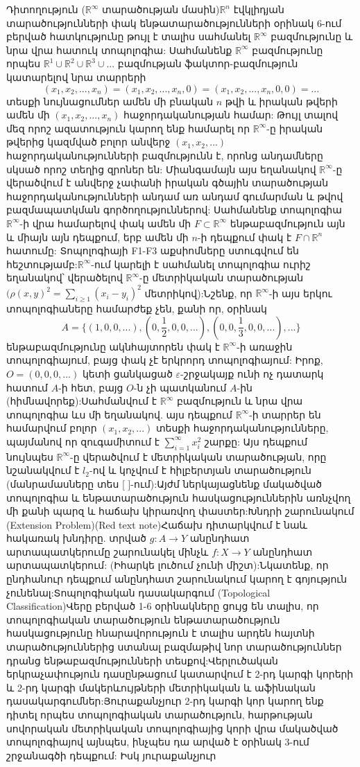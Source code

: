 Դիտողություն ($\mathbb{R}^\infty$ տարածության մասին)$\mathbb{R}^n$ էվկլիդյան տարածությունների փակ ենթատարածությունների օրինակ 6-ում բերված հատկությունը թույլ է տալիս սահմանել $\mathbb{R}^\infty$ բազմությունը և նրա վրա հատուկ տոպոլոգիա: Սահմանենք $\mathbb{R}^\infty$ բազմությունը որպես $\mathbb{R}^1 \cup \mathbb{R}^2 \cup \mathbb{R}^3 \cup ...$ բազմության ֆակտոր-բազմություն կատարելով նրա տարրերի$$(x_1, x_2, ..., x_n) = (x_1, x_2, ..., x_n, 0) = (x_1, x_2, ..., x_n, 0, 0) = ...$$տեսքի նույնացումներ ամեն մի բնական $n$ թվի և իրական թվերի ամեն մի $(x_1, x_2, ..., x_n)$ հաջորդականության համար: Թույլ տալով մեզ որոշ ազատություն կարող ենք համարել որ $\mathbb{R}^\infty$-ը իրական թվերից կազմված բոլոր անվերջ $(x_1, x_2, ...)$ հաջորդականությունների բազմությունն է, որոնց անդամները սկսած որոշ տեղից զրոներ են: Միանգամայն այս եղանակով $\mathbb{R}^\infty$-ը վերածվում է անվերջ չափանի իրական գծային տարածության հաջորդականությունների անդամ առ անդամ գումարման և թվով բազմապատկման գործողություններով: Սահմանենք տոպոլոգիա $\mathbb{R}^\infty$-ի վրա համարելով փակ ամեն մի $F \subset \mathbb{R}^\infty$ ենթաբազմություն այն և միայն այն դեպքում, երբ ամեն մի $n$-ի դեպքում փակ է $F \cap \mathbb{R}^n$ հատումը: Տոպոլոգիայի F1-F3 աքսիոմները ստուգվում են հեշտությամբ:$\mathbb{R}^\infty$-ում կարելի է սահմանել տոպոլոգիա ուրիշ եղանակով՝ վերածելով $\mathbb{R}^\infty$-ը մետրիկական տարածության $(\rho(x, y)^2 = \sum_{i \ge 1} (x_i - y_i)^2$ մետրիկով):Նշենք, որ $\mathbb{R}^\infty$-ի այս երկու տոպոլոգիաները համարժեք չեն, քանի որ, օրինակ$$A = \{(1, 0, 0, ...), (0, \frac{1}{2}, 0, 0, ...), (0, 0, \frac{1}{3}, 0, 0, ...), ...\}$$ենթաբազմությունը ակնհայտորեն փակ է $\mathbb{R}^\infty$-ի առաջին տոպոլոգիայում, բայց փակ չէ երկրորդ տոպոլոգիայում: Իրոք, $O=(0, 0, 0, ...)$ կետի ցանկացած $\varepsilon$-շրջակայք ունի ոչ դատարկ հատում $A$-ի հետ, բայց $O$-ն չի պատկանում $A$-ին (հիմնավորեք):Սահմանվում է $\mathbb{R}^\infty$ բազմություն և նրա վրա տոպոլոգիա ևս մի եղանակով. այս դեպքում $\mathbb{R}^\infty$-ի տարրեր են համարվում բոլոր $(x_1, x_2, ...)$ տեսքի հաջորդականությունները, պայմանով որ զուգամիտում է $\sum_{i=1}^\infty x_i^2$ շարքը: Այս դեպքում նույնպես $\mathbb{R}^\infty$-ը վերածվում է մետրիկական տարածության, որը նշանակվում է $l_2$-ով և կոչվում է հիլբերտյան տարածություն (մանրամասները տես [ ]-ում):Այժմ ներկայացնենք մակածված տոպոլոգիա և ենթատարածություն հասկացություններին առնչվող մի քանի պարզ և հաճախ կիրառվող փաստեր:Խնդրի շարունակում (Extension Problem)(Red text note)Հաճախ դիտարկվում է նաև հակառակ խնդիրը. տրված $g: A \to Y$ անընդհատ արտապատկերումը շարունակել մինչև $f: X \to Y$ անընդհատ արտապատկերում: (Իհարկե լուծում չունի միշտ):Նկատենք, որ ընդհանուր դեպքում անընդհատ շարունակում կարող է գոյություն չունենալ:Տոպոլոգիական դասակարգում (Topological Classification)Վերը բերված 1-6 օրինակները ցույց են տալիս, որ տոպոլոգիական տարածություն ենթատարածություն հասկացությունը հնարավորություն է տալիս արդեն հայտնի տարածություններից ստանալ բազմաթիվ նոր տարածություններ դրանց ենթաբազմությունների տեսքով:Վերլուծական երկրաչափություն դասընթացում կատարվում է 2-րդ կարգի կորերի և 2-րդ կարգի մակերևույթների մետրիկական և աֆինական դասակարգումներ:Յուրաքանչյուր 2-րդ կարգի կոր կարող ենք դիտել որպես տոպոլոգիական տարածություն, հարթության սովորական մետրիկական տոպոլոգիայից կորի վրա մակածված տոպոլոգիայով այնպես, ինչպես դա արված է օրինակ 3-ում շրջանագծի դեպքում: Իսկ յուրաքանչյուր 